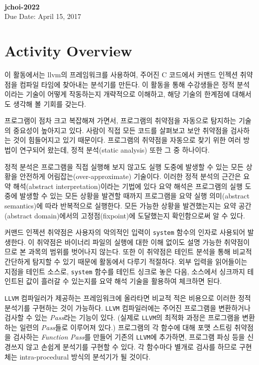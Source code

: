 \documentclass[a4paper, 11pt]{article}
\theoremstyle{definition}
\begin{document}
 \\
         {\phantom{} \hfill \textbf{jchoi-2022}} \\
         {\phantom{} \hfill Due Date: April 15, 2017} \\

\section{Activity Overview}
이 활동에서는 llvm의 프레임워크를 사용하여, 주어진 C 코드에서 커맨드 인젝션
취약점을 컴파일 타임에 찾아내는 분석기를 만든다. 이 활동을 통해 수강생들은 정적
분석이라는 기술이 어떻게 작동하는지 개략적으로 이해하고, 해당 기술의 한계점에
대해서도 생각해 볼 기회를 갖는다.

프로그램이 점차 크고 복잡해져 가면서, 프로그램의 취약점을 자동으로 탐지하는
기술의 중요성이 높아지고 있다. 사람이 직접 모든 코드를 살펴보고 보안 취약점을
검사하는 것이 힘들어지고 있기 때문이다. 프로그램의 취약점을 자동으로 찾기 위한
여러 방법이 연구되어 왔는데, 정적 분석(static analysis) 또한 그 중 하나이다.

정적 분석은 프로그램을 직접 실행해 보지 않고도 실행 도중에 발생할 수 있는 모든
상황을 안전하게 어림잡는(over-approximate) 기술이다. 이러한 정적 분석의 근간은
요약 해석(abstract interpretation)이라는 기법에 있다\cite{abstract, framework}
요약 해석은 프로그램의 실행 도중에 발생할 수 있는 모든 상황을 발견할 때까지
프로그램을 요약 실행 의미(abstract semantics)에 따라 반복적으로 실행한다. 모든
가능한 상황을 발견했는지는 요약 공간(abstract domain)에서의 고정점(fixpoint)에
도달했는지 확인함으로써 알 수 있다\cite{PALecture}.

커맨드 인젝션 취약점은 사용자의 악의적인 입력이 \texttt{system} 함수의 인자로
사용되어 발생한다. 이 취약점은 바이너리 파일의 실행에 대한 이해 없이도 설명
가능한 취약점이므로 본 과목의 범위를 벗어나지 않는다. 또한 이 취약점은 테인트
분석을 통해 비교적 간단하게 탐지할 수 있기 때문에 활동에서 다루기 적절하다. 외부
입력을 읽어들이는 지점을 테인트 소스로, \texttt{system} 함수를 테인트 싱크로
놓은 다음, 소스에서 싱크까지 테인트된 값이 흘러갈 수 있는지를 요약 해석 기술을
활용하여 체크하면 된다.

\texttt{LLVM} 컴파일러가 제공하는 프레임워크에 올라타면 비교적 적은 비용으로
이러한 정적 분석기를 구현하는 것이 가능하다. \texttt{LLVM} 컴파일러에는 주어진
프로그램을 변환하거나 검사할 수 있는 \emph{Pass}라는 기능이 있다\cite{LLVMPass}.
(실제로 \texttt{LLVM}의 최적화 과정은 프로그램을 변환하는 일련의 \emph{Pass}들로
이루어져 있다.) 프로그램의 각 함수에 대해 포맷 스트링 취약점을 검사하는
\emph{Function Pass}를 만들어 기존의 \texttt{LLVM}에 추가하면, 프로그램 파싱
등을 신경쓰지 않고 손쉽게 분석기를 구현할 수 있다. 각 함수마다 별개로 검사를
하므로 구현체는 intra-procedural 방식의 분석기가 될 것이다.
\end{document}
